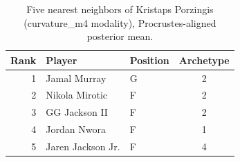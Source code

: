 \begin{table}[htbp]
  \centering\small
  \begin{tabular}{rllc}
    \toprule
    Rank & Player & Position & Archetype \\
    \midrule
    1 & Jamal Murray & G & 2 \\
    2 & Nikola Mirotic & F & 2 \\
    3 & GG Jackson II & F & 2 \\
    4 & Jordan Nwora & F & 1 \\
    5 & Jaren Jackson Jr. & F & 4 \\
    \bottomrule
  \end{tabular}
  \caption{Five nearest neighbors of Kristaps Porzingis (curvature_m4 modality), Procrustes-aligned posterior mean.}
  \label{tab:Kristaps_Porzingis_neighbors_curvature_m4}
\end{table}

